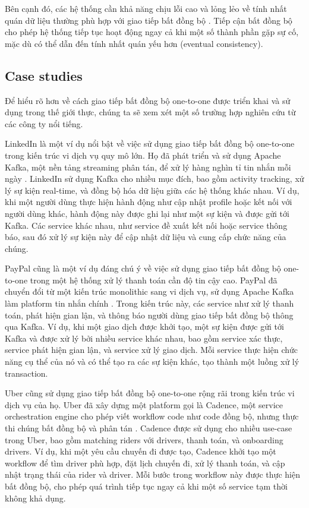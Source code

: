 Bên cạnh đó, các hệ thống cần khả năng chịu lỗi cao và lỏng lẻo về tính nhất quán dữ liệu thường phù hợp với giao tiếp bất đồng bộ \cite{fowler2002}. Tiếp cận bất đồng bộ cho phép hệ thống tiếp tục hoạt động ngay cả khi một số thành phần gặp sự cố, mặc dù có thể dẫn đến tính nhất quán yếu hơn (eventual consistency).

\subsection{Case studies}
Để hiểu rõ hơn về cách giao tiếp bất đồng bộ one-to-one được triển khai và sử dụng trong thế giới thực, chúng ta sẽ xem xét một số trường hợp nghiên cứu từ các công ty nổi tiếng.

LinkedIn là một ví dụ nổi bật về việc sử dụng giao tiếp bất đồng bộ one-to-one trong kiến trúc vi dịch vụ quy mô lớn. Họ đã phát triển và sử dụng Apache Kafka, một nền tảng streaming phân tán, để xử lý hàng nghìn tỉ tin nhắn mỗi ngày \cite{goodhope2012}. LinkedIn sử dụng Kafka cho nhiều mục đích, bao gồm activity tracking, xử lý sự kiện real-time, và đồng bộ hóa dữ liệu giữa các hệ thống khác nhau. Ví dụ, khi một người dùng thực hiện hành động như cập nhật profile hoặc kết nối với người dùng khác, hành động này được ghi lại như một sự kiện và được gửi tới Kafka. Các service khác nhau, như service đề xuất kết nối hoặc service thông báo, sau đó xử lý sự kiện này để cập nhật dữ liệu và cung cấp chức năng của chúng.

PayPal cũng là một ví dụ đáng chú ý về việc sử dụng giao tiếp bất đồng bộ one-to-one trong một hệ thống xử lý thanh toán cần độ tin cậy cao. PayPal đã chuyển đổi từ một kiến trúc monolithic sang vi dịch vụ, sử dụng Apache Kafka làm platform tin nhắn chính \cite{raman2016}. Trong kiến trúc này, các service như xử lý thanh toán, phát hiện gian lận, và thông báo người dùng giao tiếp bất đồng bộ thông qua Kafka. Ví dụ, khi một giao dịch được khởi tạo, một sự kiện được gửi tới Kafka và được xử lý bởi nhiều service khác nhau, bao gồm service xác thực, service phát hiện gian lận, và service xử lý giao dịch. Mỗi service thực hiện chức năng cụ thể của nó và có thể tạo ra các sự kiện khác, tạo thành một luồng xử lý transaction.

Uber cũng sử dụng giao tiếp bất đồng bộ one-to-one rộng rãi trong kiến trúc vi dịch vụ của họ. Uber đã xây dựng một platform gọi là Cadence, một service orchestration engine cho phép viết workflow code như code đồng bộ, nhưng thực thi chúng bất đồng bộ và phân tán \cite{fateev2017}. Cadence được sử dụng cho nhiều use-case trong Uber, bao gồm matching riders với drivers, thanh toán, và onboarding drivers. Ví dụ, khi một yêu cầu chuyến đi được tạo, Cadence khởi tạo một workflow để tìm driver phù hợp, đặt lịch chuyến đi, xử lý thanh toán, và cập nhật trạng thái của rider và driver. Mỗi bước trong workflow này được thực hiện bất đồng bộ, cho phép quá trình tiếp tục ngay cả khi một số service tạm thời không khả dụng.

